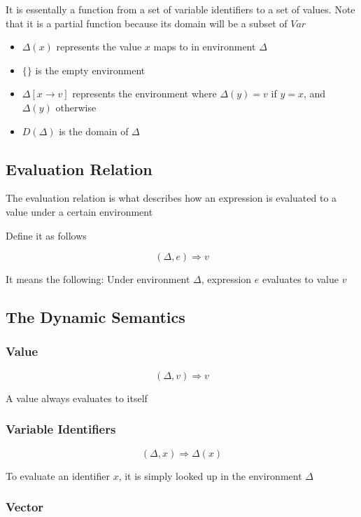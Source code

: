 \documentclass[titlepage]{article}
\begin{document}
It is essentally a function from a set of variable identifiers to a set of values. Note that it is a partial function because its domain will be a subset of $Var$
\begin{itemize}
\item $\Delta (x)$ represents the value $x$ maps to in environment $\Delta$
\item $\{\}$ is the empty environment
\item $\Delta [x \rightarrow v]$ represents the environment where $\Delta (y) = v$ if $y = x$, and $\Delta (y)$ otherwise
\item $D(\Delta)$ is the domain of $\Delta$
\end{itemize}

\subsection{Evaluation Relation}

The evaluation relation is what describes how an expression is evaluated to a value under a certain environment

Define it as follows

$$(\Delta, e) \Rightarrow v$$

It means the following: Under environment $\Delta$, expression $e$ evaluates to value $v$

\subsection{The Dynamic Semantics}

\subsubsection{Value}

$$(\Delta, v) \Rightarrow v$$

A value always evaluates to itself

\subsubsection{Variable Identifiers}
$$(\Delta, x) \Rightarrow \Delta (x)$$

To evaluate an identifier $x$, it is simply looked up in the environment $\Delta$

\subsubsection{Vector}
\end{document}
